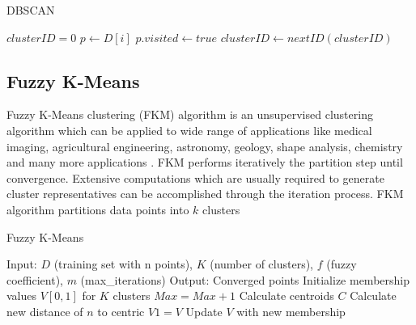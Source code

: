 \documentclass[conference, 10pt]{IEEEtran}
\begin{document}
\begin{algorithm}
\caption{DBSCAN}
\begin{algorithmic}[1]
  \State $clusterID = 0$
      \State $p \gets D[i]$
      \State $p.visited \gets true$    
          \State $clusterID \gets nextID(clusterID)$
        \EndIf
      \EndIf
  \EndFor
\EndProcedure
\Statex
{}
\EndProcedure
\end{algorithmic}
\end{algorithm}

\subsection{Fuzzy K-Means}
Fuzzy K-Means clustering (FKM) algorithm is an unsupervised clustering algorithm which can be
applied to wide range of applications like medical imaging, agricultural engineering, astronomy,
geology, shape analysis, chemistry and many more applications \cite{pattern}. FKM performs iteratively the partition step until convergence. Extensive computations which are usually required to generate cluster representatives can be accomplished through the iteration process. FKM algorithm partitions data points into $k$ clusters

\begin{algorithm}
\caption{Fuzzy K-Means}
\begin{algorithmic}[1]
\State Input: $D$ (training set with n points), $K$ (number of clusters), $f$ (fuzzy coefficient), $m$ (max\_iterations)
\State Output: Converged points
  \State Initialize membership values $V[0,1]$ for $K$ clusters
  \State $Max=Max+1$
        \State Calculate centroids $C$
        \State Calculate new distance of $n$ to centric
        \State $V1 = V$
        \State Update $V$ with new membership
    \EndFor
  \EndFor
\EndProcedure
\Statex
{}
\EndProcedure
\end{algorithmic}
\end{algorithm}

\end{document}
